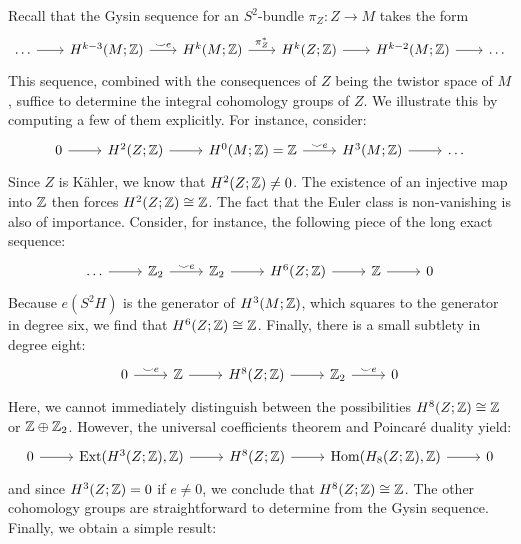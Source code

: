 Recall that the Gysin sequence for an $S^2$-bundle $\pi_Z:Z\to M$ takes the form
\begin{equation*}
	\begin{tikzcd}[column sep=0.7cm]
		\dots \ar[r] & H^{k-3}(M;\Z) \ar[r,"\smile e"] & H^k(M;\Z) \ar[r,"\pi^*_Z"]
		& H^k(Z;\Z) \ar[r] & H^{k-2}(M;\Z) \ar[r] & \dots 
	\end{tikzcd}
\end{equation*}
This sequence, combined with the consequences of $Z$ being the twistor space of $M$, suffice to determine the integral cohomology groups of $Z$. We illustrate this by computing a few of them explicitly. For instance, consider:
\begin{equation*}
	\begin{tikzcd}
		0\ar[r] & H^2(Z;\Z) \ar[r] & H^0(M;\Z)=\Z \ar[r,"\smile e"] 
		& H^3(M;\Z) \ar[r] & \dots
	\end{tikzcd}
\end{equation*}
Since $Z$ is K\"ahler, we know that $H^2(Z;\mathbb{Z})\neq 0$. The existence of an injective map into $\mathbb{Z}$ then forces $H^2(Z;\mathbb{Z})\cong\mathbb{Z}$. The fact that the Euler class is non-vanishing is also of importance. Consider, for instance, the following piece of the long exact sequence:
\begin{equation*}
	\begin{tikzcd}
		\dots \ar[r] & \Z_2 \ar[r,"\smile e"] & \Z_2 \ar[r] & H^6(Z;\Z)\ar[r] & \Z\ar[r] & 0
	\end{tikzcd}
\end{equation*}
Because $e(S^2H)$ is the generator of $H^3(M;\mathbb{Z})$, which squares to the generator in degree six, we find that $H^6(Z;\mathbb{Z})\cong \mathbb{Z}$. Finally, there is a small subtlety in degree eight:
\begin{equation*}
	\begin{tikzcd}
		0 \ar[r,"\smile e"] & \Z\ar[r] & H^8(Z;\Z) \ar[r] & \Z_2 \ar[r,"\smile e"] & 0
	\end{tikzcd}
\end{equation*}
Here, we cannot immediately distinguish between the possibilities $H^8(Z;\mathbb{Z})\cong\mathbb{Z}$ or $\mathbb{Z}\oplus \mathbb{Z}_2$. However, the universal coefficients theorem and Poincar\'e duality yield:
\begin{equation*}
	\begin{tikzcd}
		0 \ar[r] & \Ext(H^3(Z;\Z),\Z) \ar[r] & H^8(Z;\Z) \ar[r] 
		& \Hom(H_8(Z;\Z),\Z) \ar[r] & 0
	\end{tikzcd}
\end{equation*}
and since $H^3(Z;\mathbb{Z})=0$ if $e\neq 0$, we conclude that $H^8(Z;\mathbb{Z})\cong \mathbb{Z}$. The other cohomology groups are straightforward to determine from the Gysin sequence. Finally, we obtain a simple result:

